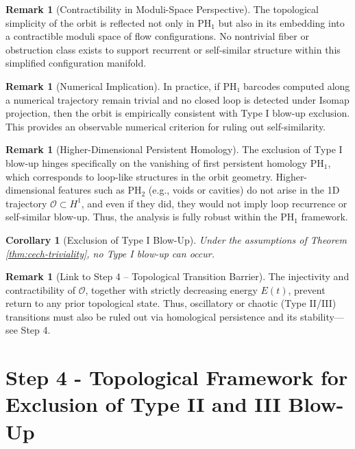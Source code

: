 \documentclass[11pt]{article}
\newtheorem{corollary}[theorem]{Corollary}
\theoremstyle{definition}
\newtheorem{remark}[theorem]{Remark}
\begin{document}
\begin{remark}[Contractibility in Moduli-Space Perspective]
The topological simplicity of the orbit is reflected not only in $\mathrm{PH}_1$ but also in its embedding into a contractible moduli space of flow configurations. No nontrivial fiber or obstruction class exists to support recurrent or self-similar structure within this simplified configuration manifold.
\end{remark}

\begin{remark}[Numerical Implication]
In practice, if PH₁ barcodes computed along a numerical trajectory remain trivial and no closed loop is detected under Isomap projection, then the orbit is empirically consistent with Type I blow-up exclusion. This provides an observable numerical criterion for ruling out self-similarity.
\end{remark}

\begin{remark}[Higher-Dimensional Persistent Homology]
The exclusion of Type I blow-up hinges specifically on the vanishing of first persistent homology $\mathrm{PH}_1$, which corresponds to loop-like structures in the orbit geometry. Higher-dimensional features such as $\mathrm{PH}_2$ (e.g., voids or cavities) do not arise in the 1D trajectory $\mathcal{O} \subset H^1$, and even if they did, they would not imply loop recurrence or self-similar blow-up. Thus, the analysis is fully robust within the $\mathrm{PH}_1$ framework.
\end{remark}

\begin{corollary}[Exclusion of Type I Blow-Up]
Under the assumptions of Theorem \ref{thm:cech-triviality}, no Type I blow-up can occur.
\end{corollary}

\begin{remark}[Link to Step 4 – Topological Transition Barrier]
The injectivity and contractibility of $\mathcal{O}$, together with strictly decreasing energy $E(t)$, prevent return to any prior topological state. Thus, oscillatory or chaotic (Type II/III) transitions must also be ruled out via homological persistence and its stability—see Step 4.
\end{remark}



\section{Step 4 - Topological Framework for Exclusion of Type II and III Blow-Up}
\label{sec:step4}
\end{document}
